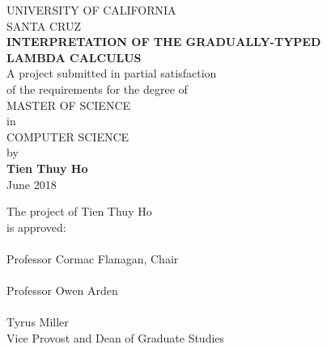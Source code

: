 \thispagestyle{empty}

\pagebreak
\begin{center}
  UNIVERSITY OF CALIFORNIA \\
  SANTA CRUZ \\
  \bigskip
  \textbf{INTERPRETATION OF THE GRADUALLY-TYPED} \\
  \textbf{LAMBDA CALCULUS} \\ 
  \bigskip
  A project submitted in partial satisfaction \\ 
  of the requirements for the degree of \\ 
  \bigskip
  MASTER OF SCIENCE \\ 
  \bigskip
  in \\
  \bigskip
  COMPUTER SCIENCE \\
  \bigskip 
  by \\ 
  \bigskip
  \textbf{Tien Thuy Ho} \\
  \bigskip
  June 2018
  \bigskip
  \bigskip
\end{center}
\begin{flushleft}
  \hspace{7cm}The project of Tien Thuy Ho \\
  \hspace{7cm}is approved: \\
  \bigskip
  \bigskip
  \hspace{7cm} \hrulefill \\
  \hspace{7cm} Professor Cormac Flanagan, Chair \\ 
  \bigskip
  \bigskip
  \hspace{7cm} \hrulefill \\
  \hspace{7cm} Professor Owen Arden \\
  \bigskip
  \bigskip 
  \underline{\hspace{6cm}} \\ 
  Tyrus Miller \\
  Vice Provost and Dean of Graduate Studies
\end{flushleft}
\pagebreak